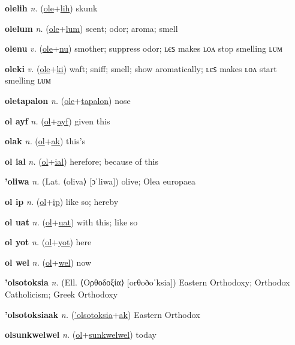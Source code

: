 \textbf{\hypertarget{olelih}{olelih}} \textit{n.} (\hyperlink{ole}{ole}+\allowbreak \hyperlink{lih}{lih})
skunk

\textbf{\hypertarget{olelum}{olelum}} \textit{n.} (\hyperlink{ole}{ole}+\allowbreak \hyperlink{lum}{lum})
scent; odor; aroma; smell

\textbf{\hypertarget{olenu}{olenu}} \textit{v.} (\hyperlink{ole}{ole}+\allowbreak \hyperlink{nu}{nu})
smother; suppress odor; ʟєꜱ makes ʟᴏᴧ stop smelling ʟᴜᴍ

\textbf{\hypertarget{oleki}{oleki}} \textit{v.} (\hyperlink{ole}{ole}+\allowbreak \hyperlink{ki}{ki})
waft; sniff; smell; show aromatically; ʟєꜱ makes ʟᴏᴧ start smelling ʟᴜᴍ

\textbf{\hypertarget{oletapalon}{oletapalon}} \textit{n.} (\hyperlink{ole}{ole}+\allowbreak \hyperlink{tapalon}{tapalon})
nose

\textbf{\hypertarget{ol ayf}{ol ayf}} \textit{n.} (\hyperlink{ol}{ol}+\allowbreak \hyperlink{ayf}{ayf})
given this

\textbf{\hypertarget{olak}{olak}} \textit{n.} (\hyperlink{ol}{ol}+\allowbreak \hyperlink{ak}{ak})
this’s

\textbf{\hypertarget{ol ial}{ol ial}} \textit{n.} (\hyperlink{ol}{ol}+\allowbreak \hyperlink{ial}{ial})
herefore; because of this

\textbf{\hypertarget{'oliwa}{'oliwa}} \textit{n.} (Lat. ⟨oliva⟩ [ɔˈliwa])
olive; Olea europaea

\textbf{\hypertarget{ol ip}{ol ip}} \textit{n.} (\hyperlink{ol}{ol}+\allowbreak \hyperlink{ip}{ip})
like so; hereby

\textbf{\hypertarget{ol uat}{ol uat}} \textit{n.} (\hyperlink{ol}{ol}+\allowbreak \hyperlink{uat}{uat})
with this; like so

\textbf{\hypertarget{ol yot}{ol yot}} \textit{n.} (\hyperlink{ol}{ol}+\allowbreak \hyperlink{yot}{yot})
here

\textbf{\hypertarget{ol wel}{ol wel}} \textit{n.} (\hyperlink{ol}{ol}+\allowbreak \hyperlink{wel}{wel})
now

\textbf{\hypertarget{'olsotoksia}{'olsotoksia}} \textit{n.} (Ell. ⟨Ορθοδοξία⟩ [orθoðoˈksia])
Eastern Orthodoxy; Orthodox Catholicism; Greek Orthodoxy

\textbf{\hypertarget{'olsotoksiaak}{'olsotoksiaak}} \textit{n.} (\hyperlink{'olsotoksia}{'olsotoksia}+\allowbreak \hyperlink{ak}{ak})
Eastern Orthodox

\textbf{\hypertarget{olsunkwelwel}{olsunkwelwel}} \textit{n.} (\hyperlink{ol}{ol}+\allowbreak \hyperlink{sunkwelwel}{sunkwelwel})
today

